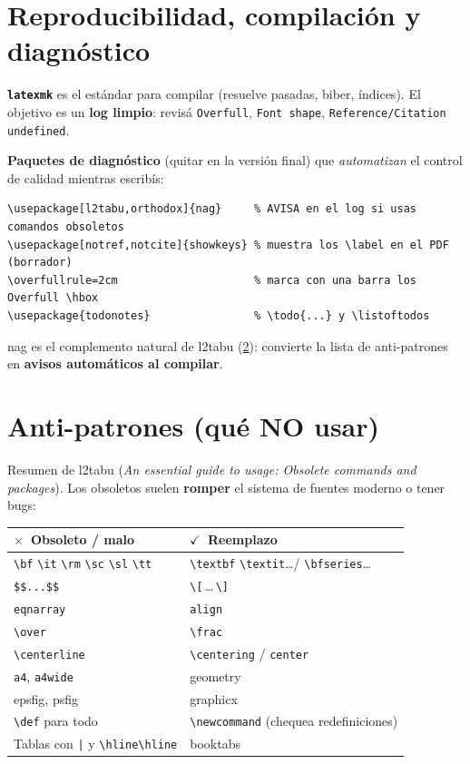 \documentclass[11pt,a4paper]{article}
\newcommand{\C}[1]{\texttt{\textbackslash #1}}
\newcommand{\pkg}[1]{\textsf{#1}}
\newcommand{\si}{\textcolor{okgreen}{\boldmath$\checkmark$}}
\newcommand{\no}{\textcolor{badred}{\boldmath$\times$}}
\begin{document}
\section{Reproducibilidad, compilación y diagnóstico}
\textbf{\texttt{latexmk}} es el estándar para compilar (resuelve pasadas, biber,
índices). El objetivo es un \textbf{log limpio}: revisá \texttt{Overfull},
\texttt{Font shape}, \texttt{Reference/Citation undefined}.

\noindent\textbf{Paquetes de diagnóstico} (quitar en la versión final) que
\emph{automatizan} el control de calidad mientras escribís:
\begin{lstlisting}
\usepackage[l2tabu,orthodox]{nag}     % AVISA en el log si usas comandos obsoletos
\usepackage[notref,notcite]{showkeys} % muestra los \label en el PDF (borrador)
\overfullrule=2cm                     % marca con una barra los Overfull \hbox
\usepackage{todonotes}                % \todo{...} y \listoftodos
\end{lstlisting}
\pkg{nag} es el complemento natural de \pkg{l2tabu} (\cref{sec:anti}): convierte
la lista de anti-patrones en \textbf{avisos automáticos al compilar}.

\section{Anti-patrones (qué NO usar)}\label{sec:anti}
Resumen de \pkg{l2tabu} (\emph{An essential guide to \LaTeXe{} usage: Obsolete
commands and packages}). Los obsoletos suelen \textbf{romper} el sistema de
fuentes moderno o tener bugs:
\begin{center}\small
\renewcommand{\arraystretch}{1.25}
\begin{tabularx}{\linewidth}{@{}l X@{}}
\toprule
\textbf{\no\ Obsoleto / malo} & \textbf{\si\ Reemplazo} \\
\midrule
\C{bf} \C{it} \C{rm} \C{sc} \C{sl} \C{tt} & \C{textbf} \C{textit}\dots / \C{bfseries}\dots \\
\verb|$$...$$| & \C{[}\,\dots\,\C{]} \\
\texttt{eqnarray} & \texttt{align} \\
\C{over} & \C{frac} \\
\C{centerline} & \C{centering} / \texttt{center} \\
\texttt{a4}, \texttt{a4wide} & \pkg{geometry} \\
\pkg{epsfig}, \pkg{psfig} & \pkg{graphicx} \\
\C{def} para todo & \C{newcommand} (chequea redefiniciones) \\
Tablas con \verb#|# y \verb|\hline\hline| & \pkg{booktabs} \\
\bottomrule
\end{tabularx}
\end{center}
\end{document}
